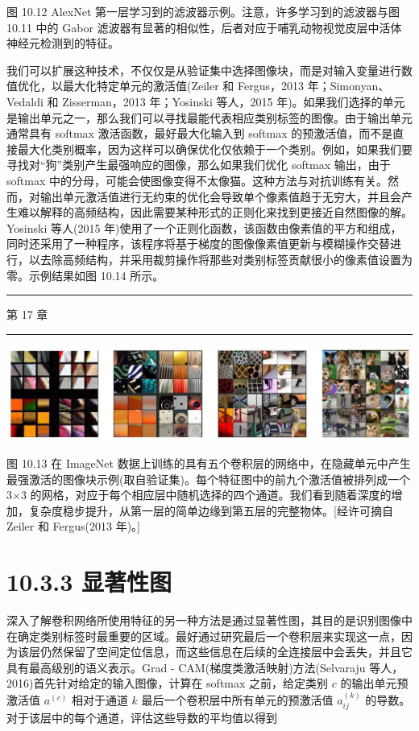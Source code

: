 \documentclass[10pt]{report}
\newcommand{\HRule}{\begin{center}\rule{0.9\linewidth}{0.2mm}\end{center}}
\begin{document}
图 10.12 AlexNet 第一层学习到的滤波器示例。注意，许多学习到的滤波器与图 10.11 中的 Gabor 滤波器有显著的相似性，后者对应于哺乳动物视觉皮层中活体神经元检测到的特征。

我们可以扩展这种技术，不仅仅是从验证集中选择图像块，而是对输入变量进行数值优化，以最大化特定单元的激活值(Zeiler 和 Fergus，2013 年；Simonyan、Vedaldi 和 Zisserman，2013 年；Yosinski 等人，2015 年)。如果我们选择的单元是输出单元之一，那么我们可以寻找最能代表相应类别标签的图像。由于输出单元通常具有 softmax 激活函数，最好最大化输入到 softmax 的预激活值，而不是直接最大化类别概率，因为这样可以确保优化仅依赖于一个类别。例如，如果我们要寻找对“狗”类别产生最强响应的图像，那么如果我们优化 softmax 输出，由于 softmax 中的分母，可能会使图像变得不太像猫。这种方法与对抗训练有关。然而，对输出单元激活值进行无约束的优化会导致单个像素值趋于无穷大，并且会产生难以解释的高频结构，因此需要某种形式的正则化来找到更接近自然图像的解。Yosinski 等人(2015 年)使用了一个正则化函数，该函数由像素值的平方和组成，同时还采用了一种程序，该程序将基于梯度的图像像素值更新与模糊操作交替进行，以去除高频结构，并采用裁剪操作将那些对类别标签贡献很小的像素值设置为零。示例结果如图 10.14 所示。

\HRule

第 17 章

\HRule

\begin{center}
\includegraphics[max width=1.0\textwidth]{images/0194e279-9b28-703a-88f4-c3ac21e2010d_324_217_404_1259_295_0.jpg}
\end{center}
\hspace*{3em} 

图 10.13 在 ImageNet 数据上训练的具有五个卷积层的网络中，在隐藏单元中产生最强激活的图像块示例(取自验证集)。每个特征图中的前九个激活值被排列成一个 3×3 的网格，对应于每个相应层中随机选择的四个通道。我们看到随着深度的增加，复杂度稳步提升，从第一层的简单边缘到第五层的完整物体。[经许可摘自 Zeiler 和 Fergus(2013 年)。]

\section*{10.3.3 显著性图}

深入了解卷积网络所使用特征的另一种方法是通过显著性图，其目的是识别图像中在确定类别标签时最重要的区域。最好通过研究最后一个卷积层来实现这一点，因为该层仍然保留了空间定位信息，而这些信息在后续的全连接层中会丢失，并且它具有最高级别的语义表示。Grad - CAM(梯度类激活映射)方法(Selvaraju 等人，2016)首先针对给定的输入图像，计算在 softmax 之前，给定类别 \(c\) 的输出单元预激活值 \({a}^{\left( c\right) }\) 相对于通道 \(k\) 最后一个卷积层中所有单元的预激活值 \({a}_{ij}^{\left( k\right) }\) 的导数。对于该层中的每个通道，评估这些导数的平均值以得到
\end{document}
